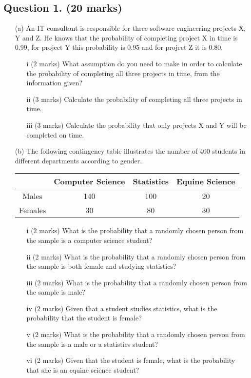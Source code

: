 

\subsection*{Question 1. (20 marks)}
\begin{itemize}
\item[(a)] An IT consultant is responsible for three software engineering projects X, Y and Z.
He knows that the probability of completing project X in time is 0.99, for project Y this probability is 0.95
and for project Z it is 0.80.

\begin{itemize}
\item[i] (2 marks) What assumption do you need to make in order to calculate the probability
of completing all three projects in time, from the information given?
\item[ii] (3 marks) Calculate the probability of completing all three projects in time.
\item[iii] (3 marks) Calculate the probability that only projects X and Y will be completed on time.
\end{itemize}


\item[(b)]The following contingency table illustrates the number of 400 students in different
departments according to gender.

\begin{center}
\begin{tabular}{|c|c|c|c|}
  \hline
   & Computer Science & Statistics & Equine Science \\\hline
  Males & 140 & 100 & 20  \\  \hline
  Females & 30 & 80 & 30  \\ \hline

  \hline
\end{tabular}
\end{center}

\begin{itemize}
\item[i] (2 marks) What is the probability that a randomly chosen person from the sample is a
computer science student?
\item[ii] (2 marks) What is the probability that a randomly chosen person from the sample is both female and studying statistics?
\item[iii] (2 marks) What is the probability that a randomly chosen person from the sample is male?
\item[iv] (2 marks) Given that a student studies statistics, what is the probability that the student is female?
\item[v] (2 marks) What is the probability that a randomly chosen person from the sample is a
male or a statistics student?
\item[vi] (2 marks) Given that the student is female, what is the probability that she is an
equine science student?
\end{itemize}
\end{itemize}


